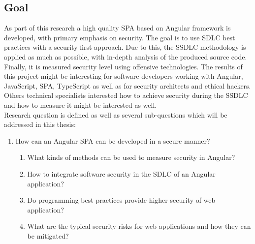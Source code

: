 \documentclass{article} %
\begin{document}
\subsection{Goal}
As part of this research a high quality SPA based on Angular framework is developed, with primary emphasis on security. The goal is to use SDLC best practices with a security first approach. Due to this, the SSDLC methodology is applied as much as possible, with in-depth analysis of the produced source code. Finally, it is measured security level using offensive technologies. The results of this project might be interesting for software developers working with Angular, JavaScript, SPA, TypeScript as well as for security architects and ethical hackers. Others technical specialists interested how to achieve security during the SSDLC and how to measure it might be interested as well.\\
\newline
Research question is defined as well as several sub-questions which will be addressed in this thesis:
\begin{enumerate}
    \item How can an Angular SPA can be developed in a secure manner?        
    \begin{enumerate}[label*=\arabic*.]
        \item What kinds of methods can be used to measure security in Angular?
        \item How to integrate software security in the SDLC of an Angular application?
        \item Do programming best practices provide higher security of web application?
        \item What are the typical security risks for web applications and how they can be mitigated?
    \end{enumerate}
\end{enumerate}
\end{document}
